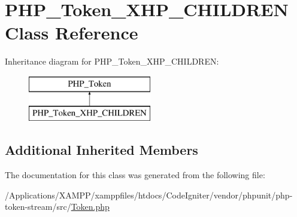 \hypertarget{class_p_h_p___token___x_h_p___c_h_i_l_d_r_e_n}{}\section{P\+H\+P\+\_\+\+Token\+\_\+\+X\+H\+P\+\_\+\+C\+H\+I\+L\+D\+R\+EN Class Reference}
\label{class_p_h_p___token___x_h_p___c_h_i_l_d_r_e_n}
Inheritance diagram for P\+H\+P\+\_\+\+Token\+\_\+\+X\+H\+P\+\_\+\+C\+H\+I\+L\+D\+R\+EN\+:\begin{figure}[H]
\begin{center}
\leavevmode
\includegraphics[height=2.000000cm]{class_p_h_p___token___x_h_p___c_h_i_l_d_r_e_n}
\end{center}
\end{figure}
\subsection*{Additional Inherited Members}


The documentation for this class was generated from the following file\+:\begin{DoxyCompactItemize}
\item 
/\+Applications/\+X\+A\+M\+P\+P/xamppfiles/htdocs/\+Code\+Igniter/vendor/phpunit/php-\/token-\/stream/src/\mbox{\hyperlink{_token_8php}{Token.\+php}}\end{DoxyCompactItemize}

